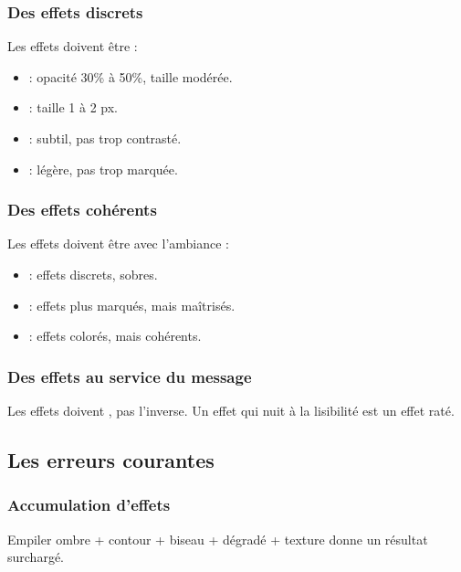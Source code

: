 \subsubsection{Des effets discrets}

Les effets doivent être  :

\begin{itemize}
    \item {} : opacité 30\% à 50\%, taille modérée.
    \item {} : taille 1 à 2 px.
    \item {} : subtil, pas trop contrasté.
    \item {} : légère, pas trop marquée.
\end{itemize}

\subsubsection{Des effets cohérents}

Les effets doivent être  avec l'ambiance :

\begin{itemize}
    \item {} : effets discrets, sobres.
    \item {} : effets plus marqués, mais maîtrisés.
    \item {} : effets colorés, mais cohérents.
\end{itemize}

\subsubsection{Des effets au service du message}

Les effets doivent , pas l'inverse. Un effet qui nuit à la lisibilité est un effet raté.

\subsection{Les erreurs courantes}

\subsubsection{Accumulation d'effets}

Empiler ombre + contour + biseau + dégradé + texture donne un résultat surchargé.

